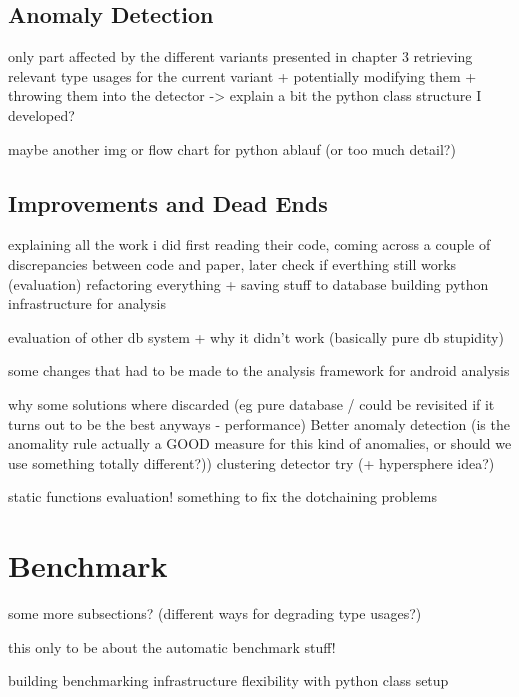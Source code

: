 \subsection{Anomaly Detection}
only part affected by the different variants presented in chapter 3
retrieving relevant type usages for the current variant + potentially modifying them + throwing them into the detector
-> explain a bit the python class structure I developed?

maybe another img or flow chart for python ablauf (or too much detail?)

\subsection{Improvements and Dead Ends}

explaining all the work i did
    first reading their code, coming across a couple of discrepancies between code and paper, later check if everthing still works (evaluation)
    refactoring everything + saving stuff to database
    building python infrastructure for analysis

evaluation of other db system + why it didn't work (basically pure db stupidity)

some changes that had to be made to the analysis framework for android analysis

why some solutions where discarded (eg pure database / could be revisited if it turns out to be the best anyways - performance)
Better anomaly detection (is the anomality rule actually a GOOD measure for this kind of anomalies, or should we use something totally different?))
    clustering detector try (+ hypersphere idea?)

static functions evaluation!
something to fix the dotchaining problems

\section{Benchmark}
some more subsections? (different ways for degrading type usages?)

this only to be about the automatic benchmark stuff!

building benchmarking infrastructure
flexibility with python class setup
